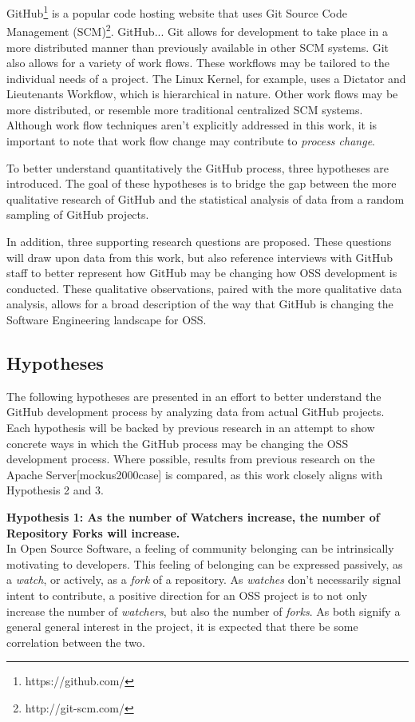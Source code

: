\documentclass{proc}
\begin{document}
GitHub\footnote{https://github.com/} is a popular code hosting website that uses Git Source Code Management (SCM)\footnote{http://git-scm.com/}. GitHub... Git allows for development to take place in a more distributed manner than previously available in other SCM systems\cite{spinellis2012git}. Git also allows for a variety of work flows\cite{chacon2009pro}. These workflows may be tailored to the individual needs of a project. The Linux Kernel, for example, uses a Dictator and
Lieutenants Workflow\cite{platschekfloss}, which is hierarchical in nature. Other work flows may be more distributed, or resemble more traditional centralized SCM systems. Although work flow techniques aren't explicitly addressed in this work, it is important to note that work flow change may contribute to \textit{process change}.

To better understand quantitatively the GitHub process, three hypotheses are introduced. The goal of these hypotheses is to bridge the gap between the more qualitative research of GitHub\cite{dabbish2012social,begel2013social} and the statistical analysis of data from a random sampling of GitHub projects.

In addition, three supporting research questions are proposed. These questions will draw upon data from this work, but also reference interviews with GitHub staff to better represent how GitHub may be changing how OSS development is conducted. These qualitative observations, paired with the more qualitative data analysis, allows for a broad description of the way that GitHub is changing the Software Engineering landscape for OSS.

\subsection{Hypotheses}
The following hypotheses are presented in an effort to better understand the GitHub development process by analyzing data from actual GitHub projects. Each hypothesis will be backed by previous research in an attempt to show concrete ways in which the GitHub process may be changing the OSS development process. Where possible, results from previous research on the Apache Server[mockus2000case] is compared, as this work closely aligns with Hypothesis 2 and 3.

\noindent \textbf{Hypothesis 1: As the number of Watchers increase, the number of Repository Forks will increase.}\\
In Open Source Software, a feeling of community belonging can be intrinsically motivating to developers\cite{lakhani2003hackers}. This feeling of belonging can be expressed passively, as a \emph{watch}, or actively, as a \emph{fork} of a repository. As \emph{watches} don't necessarily signal intent to contribute, a positive direction for an OSS project is to not only increase the number of \emph{watchers}, but also the number of \emph{forks}. As both signify a general general interest in the project, it is expected that there be some correlation between the two.
\end{document}

